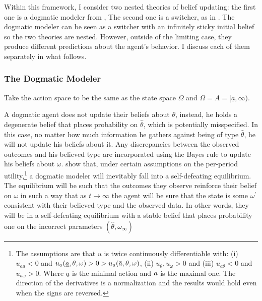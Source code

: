 \documentclass[
  12pt,
]{article}
\begin{document}
Within this framework, I consider two nested theories of belief
updating: the first one is a dogmatic modeler from \citet{Heidhues2018},
The second one is a switcher, as in \citet{Ba2023}. The dogmatic modeler
can be seen as a switcher with an infinitely sticky initial belief so
the two theories are nested. However, outside of the limiting case, they
produce different predictions about the agent's behavior. I discuss each
of them separately in what follows.

\hypertarget{the-dogmatic-modeler}{%
\subsubsection{The Dogmatic Modeler}\label{the-dogmatic-modeler}}

Take the action space to be the same as the state space \(\Omega\) and
\(\Omega =A=[\underline{a}, \infty)\).

A dogmatic agent does not update their beliefs about \(\theta\),
instead, he holds a degenerate belief that places probability on
\(\hat{\theta}\), which is potentially misspecified. In this case, no
matter how much information he gathers against being of type
\(\hat{\theta}\), he will not update his beliefs about it. Any
discrepancies between the observed outcomes and his believed type are
incorporated using the Bayes rule to update his beliefs about
\(\omega\). \citet{Heidhues2018} show that, under certain assumptions on
the per-period utility,\footnote{The assumptions are that 
$u$ is twice continuously differentiable with: (i)$u_{aa}<0$ and $u_a(\underline{a},  \theta, \omega)>0>u_a(\Bar{a}, \theta, \omega)$, 
(ii) $u_{\theta}, u_{\omega}>0$ and (iii) $u_{a\theta}<0$ and $u_{a\omega}>0$. Where $\underline{a}$ is the
minimal action and $\Bar{a}$ is the maximal one. 
 The direction of the derivatives is a normalization
and the results would hold even when the signs are reversed.} a dogmatic
modeler will inevitably fall into a self-defeating equilibrium. The
equilibrium will be such that the outcomes they observe reinforce their
belief on \(\omega\) in such a way that as \(t\to\infty\) the agent will
be sure that the state is some \(\omega^{'}\) consistent with their
believed type and the observed data. In other words, they will be in a
self-defeating equilibrium with a stable belief that places probability
one on the incorrect parameters \((\hat{\theta}, \omega_{\infty})\)
\end{document}
